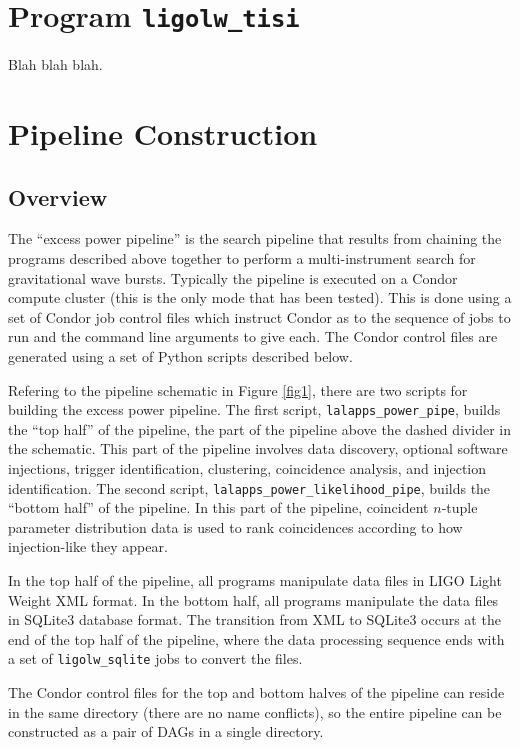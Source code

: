 \documentclass[10pt]{article}
\newcommand{\prog}[1]{\texttt{#1}}
\begin{document}
\section{Program \prog{ligolw\_tisi}}
\label{section3}



Blah blah blah.


\section{Pipeline Construction}
\label{section2}


\subsection{Overview}


The ``excess power pipeline'' is the search pipeline that results from
chaining the programs described above together to perform a
multi-instrument search for gravitational wave bursts.  Typically the
pipeline is executed on a Condor compute cluster (this is the only mode
that has been tested).  This is done using a set of Condor job control
files which instruct Condor as to the sequence of jobs to run and the
command line arguments to give each.  The Condor control files are
generated using a set of Python scripts described below.

Refering to the pipeline schematic in Figure \ref{fig1}, there are two
scripts for building the excess power pipeline.  The first script,
\prog{lalapps\_power\_pipe}, builds the ``top half'' of the pipeline, the
part of the pipeline above the dashed divider in the schematic.  This part
of the pipeline involves data discovery, optional software injections,
trigger identification, clustering, coincidence analysis, and injection
identification.  The second script,
\prog{lalapps\_power\_likelihood\_pipe}, builds the ``bottom half'' of the
pipeline.  In this part of the pipeline, coincident \(n\)-tuple parameter
distribution data is used to rank coincidences according to how
injection-like they appear.

In the top half of the pipeline, all programs manipulate data files in LIGO
Light Weight XML format.  In the bottom half, all programs manipulate the
data files in SQLite3 database format.  The transition from XML to SQLite3
occurs at the end of the top half of the pipeline, where the data
processing sequence ends with a set of \prog{ligolw\_sqlite} jobs to
convert the files.

The Condor control files for the top and bottom halves of the pipeline can
reside in the same directory (there are no name conflicts), so the entire
pipeline can be constructed as a pair of DAGs in a single directory.
\end{document}
